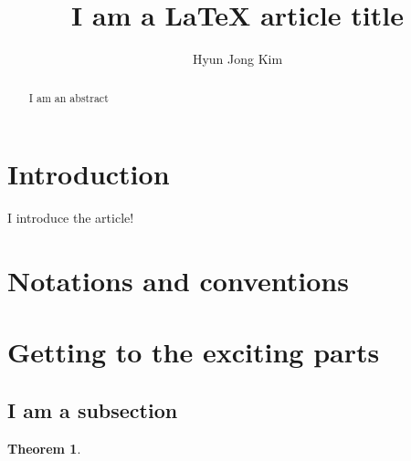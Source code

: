 \documentclass[12pt]{amsart}
\title{I am a LaTeX article title}
\author{Hyun Jong Kim}
\date{}
\numberwithin{equation}{section}
\newtheorem{theorem}[equation]{Theorem}
\begin{document}
\maketitle
\begin{abstract}
I am an abstract
\end{abstract}
\section{Introduction}
I introduce the article!

\section{Notations and conventions}
\begin{definition}
\end{definition}

\section{Getting to the exciting parts}
\subsection{I am a subsection}
\begin{theorem}
\end{theorem}



\end{document}
